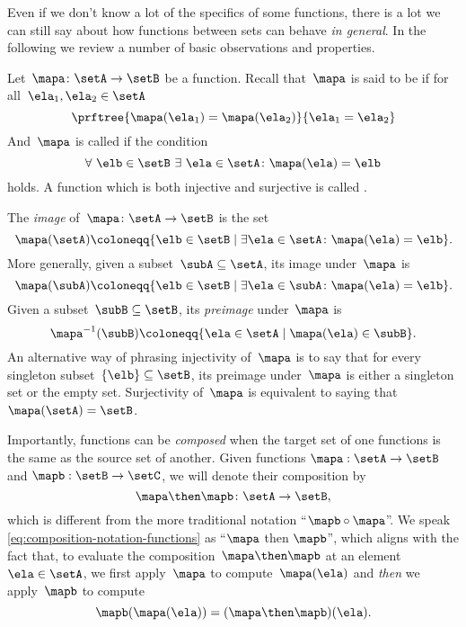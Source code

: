 Even if we don't know a lot of the specifics of some functions, there is a lot we can still say about how functions between sets can behave \emph{in general}.
In the following we review a number of basic observations and properties.

Let~$\mapa\colon \setA \to \setB$ be a function.
Recall that~$\mapa$ is said to be \emph{} if for all~$\ela_1, \ela_2 \in \setA$
\begin{equation}
    \label{eq:injectivity-cond}
    \prftree{\mapa(\ela_1) = \mapa(\ela_2)}{\ela_1 = \ela_2}
\end{equation}
And~$\mapa$ is called \emph{} if the condition
\begin{equation}
    \label{eq:surjectivity-cond}
    \forall \ \elb \in \setB \ \exists \ \ela \in \setA \colon \mapa(\ela) = \elb
\end{equation}
holds.
A function which is both injective and surjective is called \emph{}.

The \emph{image} of~$\mapa\colon \setA \to \setB$ is the set
\begin{equation}
    \mapa(\setA) \coloneqq \{ \elb \in \setB \mid \exists \ela \in \setA \colon \mapa(\ela) = \elb \}.
\end{equation}
More generally, given a subset~$\subA \subseteq \setA$, its image under~$\mapa$ is
\begin{equation*}
    \mapa(\subA) \coloneqq \{ \elb \in \setB \mid \exists \ela \in \subA \colon \mapa(\ela) = \elb \}.
\end{equation*}
Given a subset~$\subB \subseteq \setB$, its \emph{preimage} under~$\mapa$ is
\begin{equation*}
    \mapa^{-1}(\subB) \coloneqq \{ \ela \in \setA \mid  \mapa(\ela) \in \subB \}.
\end{equation*}
An alternative way of phrasing injectivity of~$\mapa$ is to say that for every singleton subset~$\{ \elb \} \subseteq \setB$, its preimage under~$\mapa$ is either a singleton set or the empty set.
Surjectivity of~$\mapa$ is equivalent to saying that~$\mapa(\setA) = \setB$.

Importantly, functions can be \emph{composed} when the target set of one functions is the same as the source set of another.
Given functions $\mapa: \setA \to \setB$ and $\mapb : \setB \to \setC$, we will denote their composition by
\begin{equation}
    \label{eq:composition-notation-functions}
    \mapa \then \mapb \colon \setA \to \setB,
\end{equation}
which is different from the more traditional notation ``$\mapb \circ \mapa$''.
We speak \cref{eq:composition-notation-functions} as ``$\mapa$ then $\mapb$'', which aligns with the fact that, to evaluate the composition~$\mapa \then \mapb$ at an element~$\ela \in \setA$, we first apply~$\mapa$ to compute~$\mapa(\ela)$ and \emph{then} we apply~$\mapb$ to compute
\begin{equation*}
    \mapb(\mapa(\ela))=(\mapa \then \mapb)(\ela).
\end{equation*}

